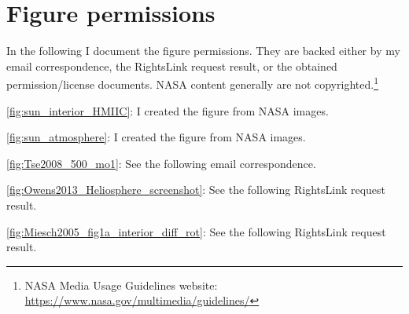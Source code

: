 
\renewcommand\listfigurename{List of Figures and their permissions}
\lofimagetrue
\listoffigures

\section*{Figure permissions}
In the following I document the figure permissions. They are backed either by my email correspondence, the RightsLink request result, or the obtained permission/license documents. NASA content generally are not copyrighted.\footnote{NASA Media Usage Guidelines website: \url{https://www.nasa.gov/multimedia/guidelines/}}

\begin{itemize*}
	\item \autoref{fig:sun_interior_HMIIC}: I created the figure from NASA images.
	\item \autoref{fig:sun_atmosphere}: I created the figure from NASA images.
	\item \autoref{fig:Tse2008_500_mo1}: See the following email correspondence.
	
	\item \autoref{fig:Owens2013_Heliosphere_screenshot}: See the following RightsLink request result.\\
	\item \autoref{fig:Miesch2005_fig1a_interior_diff_rot}: See the following RightsLink request result.\\

\end{itemize*}
